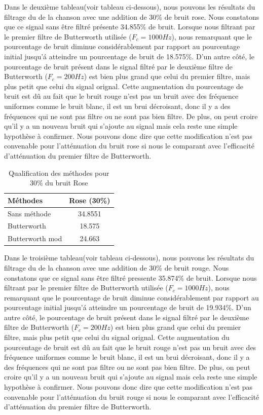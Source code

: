 \documentclass[conference,onecolumn]{IEEEtran}
\begin{document}
Dans le deuxième tableau(voir tableau ci-dessous), nous pouvons les résultats du filtrage du de la chanson avec une addition de 30\% de bruit rose. Nous constatons que ce signal sans être filtré présente 34.855\% de bruit. Lorsque nous filtrant par le premier filtre de Butterworth utilisée ($F_c = 1000 Hz$), nous remarquant que le pourcentage de bruit diminue considérablement par rapport au pourcentage initial jusqu'á atteindre un pourcentage de bruit de 18.575\%. D'un autre côté, le pourcentage de bruit présent dans le signal filtré par le deuxième filtre de Butterworth ($F_c = 200Hz$) est bien plus grand que celui du premier filtre, mais plus petit que celui du signal orignal. Cette augmentation du pourcentage de bruit est dû au fait que le bruit rouge n'est pas un bruit avec des fréquence uniformes comme le bruit blanc, il est un brui décroisant, donc il y a des fréquences qui ne sont pas filtre ou ne sont pas bien filtre. De plus, on peut croire qu'il y a un nouveau bruit qui s'ajoute au signal mais cela reste une simple hypothèse à confirmer. Nous pouvons donc dire que cette modification n'est pas convenable pour l'atténuation du bruit rose si nous le comparant avec l'efficacité d'atténuation du premier filtre de Butterworth.

\begin{table}[hbt!]
    \centering
    \begin{tabular}{ l  c }
    \textbf{Méthodes} & \textbf{Rose (30\%)} \\
    \hline
    Sans méthode &  34.8551\\
    Butterworth &  18.575\\
    Butterworth mod &  24.663\\
    \end{tabular}
    \caption{Qualification des méthodes pour 30\% du bruit Rose}
    \label{table:t8}
\end{table}

Dans le troisième tableau(voir tableau ci-dessous), nous pouvons les résultats du filtrage du de la chanson avec une addition de 30\% de bruit rouge. Nous constatons que ce signal sans être filtré pressente 35.874\% de bruit. Lorsque nous filtrant par le premier filtre de Butterworth utilisée ($F_c = 1000 Hz$), nous remarquant que le pourcentage de bruit diminue considérablement par rapport au pourcentage initial jusqu'á atteindre un pourcentage de bruit de 19.934\%. D'un autre côté, le pourcentage de bruit présent dans le signal filtré par le deuxième filtre de Butterworth ($F_c = 200 Hz$) est bien plus grand que celui du premier filtre, mais plus petit que celui du signal orignal. Cette augmentation du pourcentage de bruit est dû au fait que le bruit rouge n'est pas un bruit avec des fréquence uniformes comme le bruit blanc, il est un brui décroisant, donc il y a des fréquences qui ne sont pas filtre ou ne sont pas bien filtre. De plus, on peut croire qu'il y a un nouveau bruit qui s'ajoute au signal mais cela reste une simple hypothèse à confirmer. Nous pouvons donc dire que cette modification n'est pas convenable pour l'atténuation du bruit rouge si nous le comparant avec l'efficacité d'atténuation du premier filtre de Butterworth.
\end{document}
